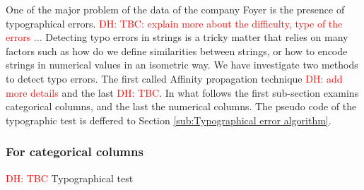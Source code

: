 \documentclass{article}
\newcommand\dhawat[1]{\textcolor{red}{DH: #1}}
\begin{document}
One of the major problem of the data of the company Foyer is the presence of typographical errors.
\dhawat{TBC: explain more about the difficulty, type of the errors ...}
Detecting typo errors in strings is a tricky matter that relies on many factors such as how do we define similarities between strings, or how to encode strings in numerical values in an isometric way.
We have investigate two methods to detect typo errors.
The first called Affinity propagation technique \dhawat{add more details} and the last \dhawat{TBC}.
In what follows the first sub-section examins categorical columns, and the last the numerical columns.
The pseudo code of the typographic test is deffered to Section \ref{sub:Typographical error algorithm}.

\subsubsection{For categorical columns}
\dhawat{TBC} Typographical test
\end{document}
